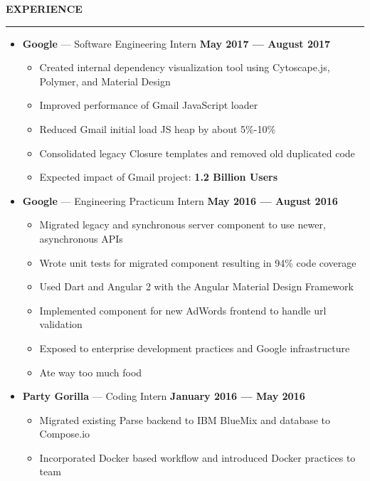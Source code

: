 \documentclass[10pt, oneside]{letter}
\newcommand{\linespaceshit} {
  \vspace{0.05in}
  \hrule
  \vspace{0.05in}
}
\newcommand{\textapprox}{\raisebox{0.5ex}{\texttildelow}}
\begin{document}
  \textbf{EXPERIENCE}
  \linespaceshit
    \begin{adjustwidth}{0.1in}{0pt}

      \begin{itemize}
        \item
          \textbf{Google} --- Software Engineering Intern \hfill  \textbf{May 2017 --- August 2017}
            \begin{itemize}
              \item Created internal dependency visualization tool using Cytoscape.js, Polymer, and Material Design
              \item Improved performance of Gmail JavaScript loader
              \item Reduced Gmail initial load JS heap by about 5\%-10\%
              \item Consolidated legacy Closure templates and removed old duplicated code
              \item Expected impact of Gmail project: \textbf{\textapprox 1.2 Billion Users}
            \end{itemize}
        \item
          \textbf{Google} --- Engineering Practicum Intern \hfill  \textbf{May 2016 --- August 2016}
            \begin{itemize}
              \item Migrated legacy and synchronous server component to use newer, asynchronous APIs
              \item Wrote unit tests for migrated component resulting in 94\% code coverage
              \item Used Dart and Angular 2 with the Angular Material Design Framework
              \item Implemented component for new AdWords frontend to handle url validation
              \item Exposed to enterprise development practices and Google infrastructure
              \item Ate way too much food
            \end{itemize}
        \item
          \textbf{Party Gorilla} --- Coding Intern \hfill \textbf{January 2016 --- May 2016}
            \begin{itemize}
              \item Migrated existing Parse backend to IBM BlueMix and database to Compose.io
              \item Incorporated Docker based workflow and introduced Docker practices to team

\end{itemize}
\end{itemize}
\end{adjustwidth}
\end{document}
